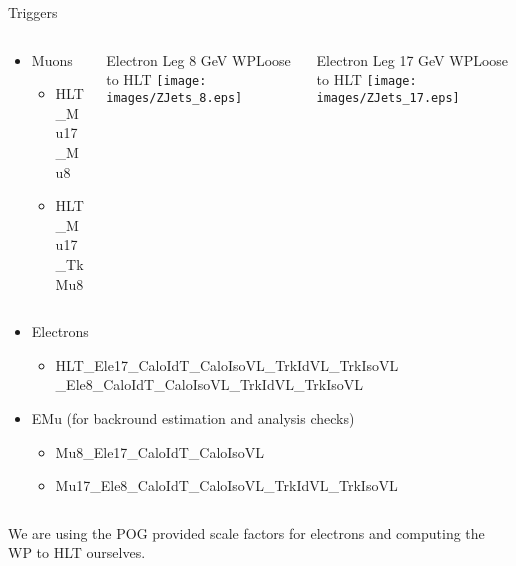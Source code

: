 \documentclass{beamer}
\begin{document}
\begin{frame}{Triggers}

  \begin{columns}
    \begin{column}{0.4\textwidth}
      \begin{itemize}
      \item
        \footnotesize Muons
        \begin{itemize}
          \scriptsize
        \item
          HLT\_Mu17\_Mu8
        \item
          HLT\_Mu17\_TkMu8
        \end{itemize}
      \end{itemize}
    \end{column}
    \begin{column}{0.3\textwidth}
      \begin{center}
        {\tiny Electron Leg 8 GeV WPLoose to HLT}
        \texttt{[image: images/ZJets\_8.eps]}
      \end{center}
    \end{column}
    \begin{column}{0.3\textwidth}
      \begin{center}
      {\tiny Electron Leg 17 GeV WPLoose to HLT}
      \texttt{[image: images/ZJets\_17.eps]}
      \end{center}
    \end{column}
  \end{columns}
  
  \begin{columns}
    \begin{column}{1.0\textwidth}
  \begin{itemize}
  \item
    \footnotesize  Electrons
    \begin{itemize}
      \tiny
    \item
      HLT\_Ele17\_CaloIdT\_CaloIsoVL\_TrkIdVL\_TrkIsoVL \_Ele8\_CaloIdT\_CaloIsoVL\_TrkIdVL\_TrkIsoVL
    \end{itemize}
  \item
    \footnotesize EMu (for backround estimation and analysis checks)
    \begin{itemize}
      \scriptsize
    \item
      Mu8\_Ele17\_CaloIdT\_CaloIsoVL
    \item
      Mu17\_Ele8\_CaloIdT\_CaloIsoVL\_TrkIdVL\_TrkIsoVL
    \end{itemize}
  \end{itemize}
  \end{column}
    \begin{column}{0.0\textwidth}
    \end{column}
  \end{columns}

\vspace{2em}

We are using the POG provided scale factors for electrons and computing the WP to HLT ourselves. 



\end{frame}
\end{document}
